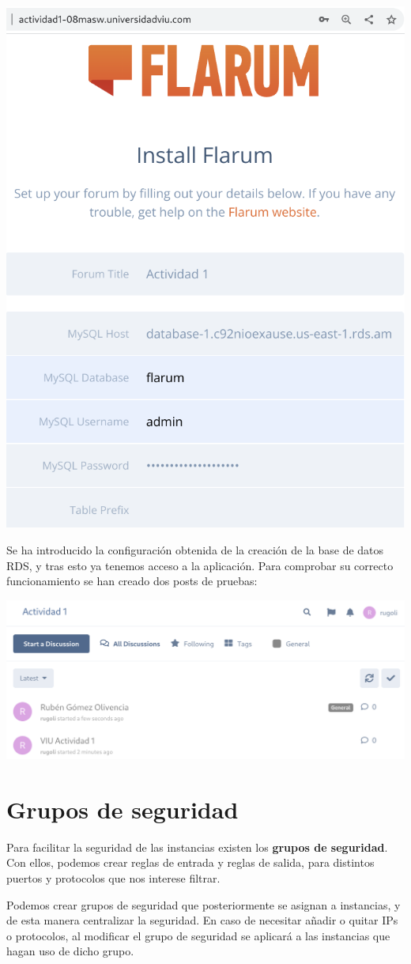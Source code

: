 \documentclass{\ClassPath/viu-tfm-template}
\begin{document}
\begin{center}
    \includegraphics[frame,width=0.5\linewidth]{img/installer.png}
\end{center}

Se ha introducido la configuración obtenida de la creación de la base de datos RDS, y tras esto ya tenemos acceso a la aplicación. Para comprobar su correcto funcionamiento se han creado dos posts de pruebas:

\begin{center}
    \includegraphics[frame,width=0.9\linewidth]{img/flarum.png}
\end{center}




\chapter{Grupos de seguridad}
Para facilitar la seguridad de las instancias existen los \textbf{grupos de seguridad}. Con ellos, podemos crear reglas de entrada y reglas de salida, para distintos puertos y protocolos que nos interese filtrar.

Podemos crear grupos de seguridad que posteriormente se asignan a instancias, y de esta manera centralizar la seguridad. En caso de necesitar añadir o quitar IPs o protocolos, al modificar el grupo de seguridad se aplicará a las instancias que hagan uso de dicho grupo.
\end{document}
